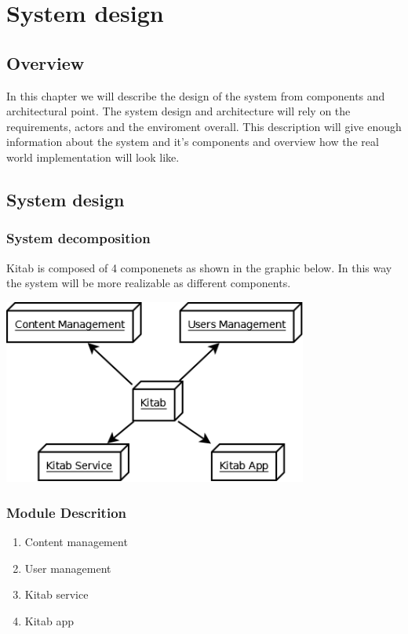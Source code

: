 \chapter{System design}
\section{Overview}

In this chapter we will describe the design of the system from components and architectural point. The system design and architecture will rely on the requirements, actors and the enviroment overall. This description will give enough information about the system and it's components and overview how the real world implementation will look like.

\section{System design}
	\subsection{System decomposition}

Kitab is composed of 4 componenets as shown in the graphic below. In this way the system will be more realizable as different components.

	\begin{center}
	\includegraphics[width=10cm]{Diagram/System Decomposition.png}
	\end{center}

	\subsection{Module Descrition}

	\begin{enumerate}
		\item Content management
		\item User management
		\item Kitab service
		\item Kitab app
	\end{enumerate}

